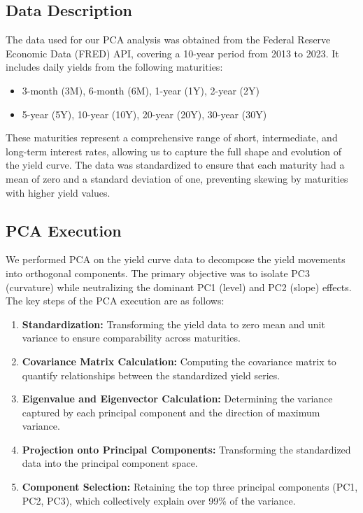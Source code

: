 \documentclass[12pt]{article}
\begin{document}
\subsection{Data Description}

The data used for our PCA analysis was obtained from the Federal Reserve Economic Data (FRED) API, covering a 10-year period from 2013 to 2023. It includes daily yields from the following maturities:
\begin{itemize}
    \item 3-month (3M), 6-month (6M), 1-year (1Y), 2-year (2Y)
    \item 5-year (5Y), 10-year (10Y), 20-year (20Y), 30-year (30Y)
\end{itemize}

These maturities represent a comprehensive range of short, intermediate, and long-term interest rates, allowing us to capture the full shape and evolution of the yield curve. The data was standardized to ensure that each maturity had a mean of zero and a standard deviation of one, preventing skewing by maturities with higher yield values.

\subsection{PCA Execution}

We performed PCA on the yield curve data to decompose the yield movements into orthogonal components. The primary objective was to isolate PC3 (curvature) while neutralizing the dominant PC1 (level) and PC2 (slope) effects. The key steps of the PCA execution are as follows:
\begin{enumerate}
    \item \textbf{Standardization:} Transforming the yield data to zero mean and unit variance to ensure comparability across maturities.
    \item \textbf{Covariance Matrix Calculation:} Computing the covariance matrix to quantify relationships between the standardized yield series.
    \item \textbf{Eigenvalue and Eigenvector Calculation:} Determining the variance captured by each principal component and the direction of maximum variance.
    \item \textbf{Projection onto Principal Components:} Transforming the standardized data into the principal component space.
    \item \textbf{Component Selection:} Retaining the top three principal components (PC1, PC2, PC3), which collectively explain over 99\% of the variance.
\end{enumerate}
\end{document}
